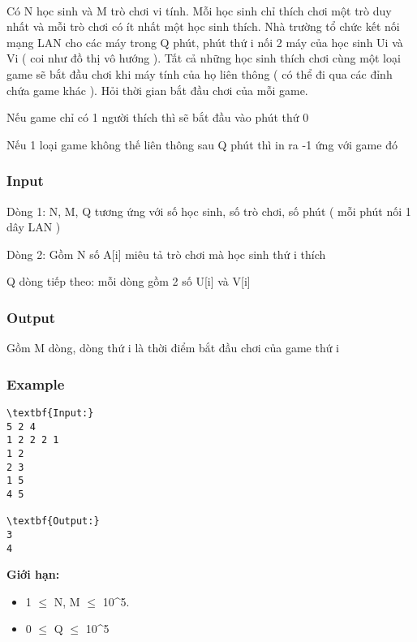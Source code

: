 

 

Có N học sinh và M trò chơi vi tính. Mỗi học sinh chỉ thích chơi một trò duy nhất và mỗi trò chơi có ít nhất một học sinh thích. Nhà trường tổ chức kết nối mạng LAN cho các máy trong Q phút, phút thứ i nối 2 máy của học sinh Ui và Vi ( coi như đồ thị vô hướng ). Tất cả những học sinh thích chơi cùng một loại game sẽ bắt đầu chơi khi máy tính của họ liên thông ( có thể đi qua các đỉnh chứa game khác ). Hỏi thời gian bắt đầu chơi của mỗi game.

Nếu game chỉ có 1 người thích thì sẽ bắt đầu vào phút thứ 0

Nếu 1 loại game không thế liên thông sau Q phút thì in ra -1 ứng với game đó

\subsubsection{Input}

Dòng 1: N, M, Q tương ứng với số học sinh, số trò chơi, số phút ( mỗi phút nối 1 dây LAN )


Dòng 2: Gồm N số A[i] miêu tả trò chơi mà học sinh thứ i thích


Q dòng tiếp theo: mỗi dòng gồm 2 số U[i] và V[i]

\subsubsection{Output}

Gồm M dòng, dòng thứ i là thời điểm bắt đầu chơi của game thứ i

\subsubsection{Example}
\begin{verbatim}
\textbf{Input:}
5 2 4
1 2 2 2 1
1 2
2 3
1 5
4 5

\textbf{Output:}
3
4\end{verbatim}


\textbf{Giới hạn:} 
\begin{itemize}
	\item 1  $\le$  N, M  $\le$  10^5.
	\item 0  $\le$  Q  $\le$  10^5
\end{itemize}
